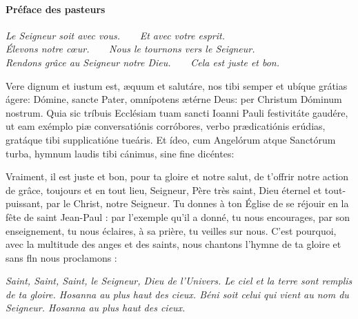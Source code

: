 \documentclass[twoside]{article}
\begin{document}
\paragraph{Préface des pasteurs}


\emph{\vv Le Seigneur soit avec vous.~~~~\rr Et avec votre esprit.\\
\vv Élevons notre cœur.~~~~\rr Nous le tournons vers le Seigneur.\\
\vv Rendons grâce au Seigneur notre Dieu.~~~~\rr Cela est juste et bon.}

\begin{paracol}{2}
\switchcolumn
\switchcolumn*

Vere dignum et iustum est, æquum et salutáre,
nos tibi semper et ubíque grátias ágere:
Dómine, sancte Pater, omnípotens ætérne Deus:
per Christum Dóminum nostrum.
Quia sic tríbuis Ecclésiam tuam sancti Ioanni Pauli festivitáte gaudére,
ut eam exémplo piæ conversatiónis corróbores,
verbo prædicatiónis erúdias,
gratáque tibi supplicatióne tueáris.
Et ídeo, cum Angelórum atque Sanctórum turba,
hymnum laudis tibi cánimus, sine fine dicéntes: 

\switchcolumn

Vraiment, il est juste et bon,
pour ta gloire et notre salut,
de t'offrir notre action de grâce,
toujours et en tout lieu,
Seigneur, Père très saint,
Dieu éternel et tout-puissant,
par le Christ, notre Seigneur.
Tu donnes à ton Église de se réjouir
en la fête de saint Jean-Paul :
par l'exemple qu'il a donné, tu nous encourages,
par son enseignement, tu nous éclaires,
à sa prière, tu veilles sur nous.
C'est pourquoi,
avec la multitude des anges et des saints,
nous chantons l'hymne de ta gloire
et sans fln nous proclamons :

\end{paracol}

\newpage

\emph{Saint, Saint, Saint, le Seigneur, Dieu de l'Univers. Le ciel et la terre sont remplis de ta gloire. Hosanna au plus haut des cieux. Béni soit celui qui vient au nom du Seigneur. Hosanna au plus haut des cieux.}
\end{document}

